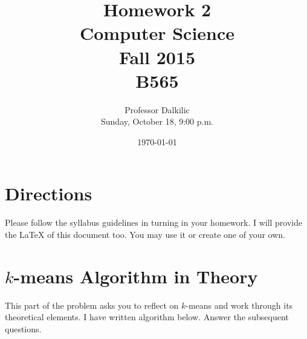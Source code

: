 \documentclass{article}
\begin{document}
\title{Homework 2\\ Computer Science \\ Fall 2015\\ B565}         %
\author{Professor Dalkilic\\ Sunday, October 18, 9:00 p.m.}        %
\date{\today}          %
\maketitle


\makeatother     %



\pagestyle{plain}
\section*{Directions}
Please follow the syllabus guidelines in turning in your homework.  I will provide the \LaTeX{} of this document too.  You may use it or create one of your own.

\section{$k$-means Algorithm in Theory}
This part of the problem asks you to reflect on $k$-means and work through its theoretical elements.  I have written algorithm below.   Answer the subsequent questions.
\end{document}
